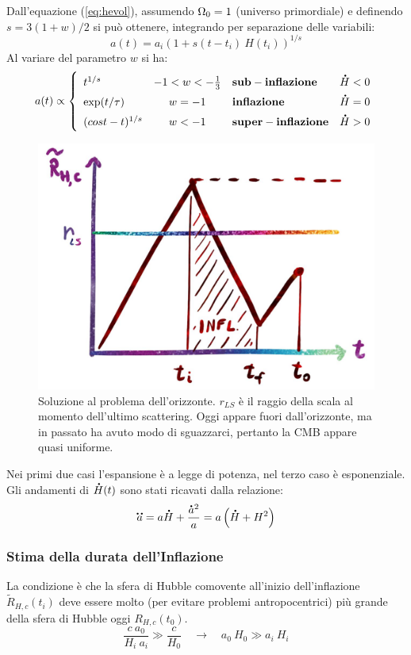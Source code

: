 Dall'equazione (\ref{eq:hevol}), assumendo $\Omega_0 = 1$ (universo primordiale) e definendo $s=3(1+w)/2$ si può ottenere, integrando per separazione delle variabili:
\begin{equation}
    a(t)=a_i \left( 1+s(t-t_i) ~H(t_i)\right)^{1/s}
\end{equation}
Al variare del parametro $w$ si ha:
\begin{equation}a(t) \propto\left\{
    \def\arraystretch{1.5}
        \begin{array}{lcll}
            t^{1/s} & -1 < w < -\frac{1}{3} &\mathbf{sub-inflazione} & \dt{H}<0 \\
            \exp (t/\tau)&  w=-1 & \mathbf{inflazione} & \dt{H}=0 \\
            (cost-t)^{1/s} & w<-1 & \mathbf{super-inflazione} & \dt{H}>0 \\
    \end{array}\right.
\end{equation}
\begin{figure}[ht]
    \centering
    \includegraphics[width=.7\textwidth]{Pictures/4/pbhorsol.jpg}
    \caption{Soluzione al problema dell'orizzonte. $r_{LS}$ è il raggio della scala al momento dell'ultimo scattering. Oggi appare fuori dall'orizzonte, ma in passato ha avuto modo di sguazzarci, pertanto la CMB appare quasi uniforme.}
    \label{fig4:hubblespheremod}
\end{figure}

Nei primi due casi l'espansione è a legge di potenza, nel terzo caso è esponenziale. Gli andamenti di $\accentset{\mbox{\large\bfseries .}}{H}(t)$ sono stati ricavati dalla relazione:
\begin{equation*}
    \accentset{\mbox{\large\bfseries ..}}{a}= a\accentset{\mbox{\large\bfseries .}}{H} + \frac{\accentset{\mbox{\large\bfseries .}}{a}^2}{a} = a \left(  \accentset{\mbox{\large\bfseries .}}{H} + H^2\right)
\end{equation*}

\subsubsection{Stima della durata dell'Inflazione}
La condizione è che la sfera di Hubble comovente all'inizio dell'inflazione $\tilde{R}_{H,c}(t_i)$ deve essere molto (per evitare problemi antropocentrici) più grande della sfera di Hubble oggi ${R}_{H,c}(t_0)$.
\begin{equation*}
\frac{c ~a_0}{H_i ~a_i} \gg \frac{c}{H_0} \quad \rightarrow \quad a_0 ~H_0 \gg a_i ~H_i
\end{equation*}

